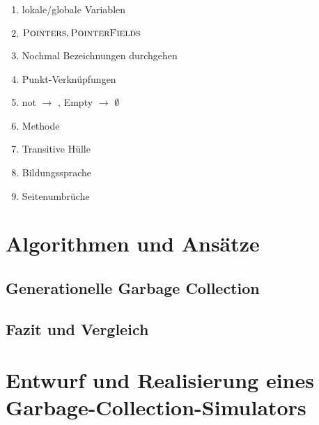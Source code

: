 
\listfiles


\listoftodos

\begin{enumerate}
	\item lokale/globale Variablen
	\item $\textsc{Pointers}, \textsc{PointerFields}$
	\item Nochmal Bezeichnungen durchgehen
	\item Punkt-Verknüpfungen
	\item not $\rightarrow$ \NOT, Empty $\rightarrow$ $\emptyset$
	\item Methode
	\item Transitive Hülle
	\item Bildungssprache
	\item Seitenumbrüche
\end{enumerate}



\cleardoublepage

\setcounter{page}{1}
\pagestyle{maincontentstyle}


\part{Algorithmen und Ansätze}



\chapter{Generationelle Garbage Collection}	%
\chapter{Fazit und Vergleich}		%

\part{Entwurf und Realisierung eines Garbage-Collection-Simulators}

\cleardoublepage






